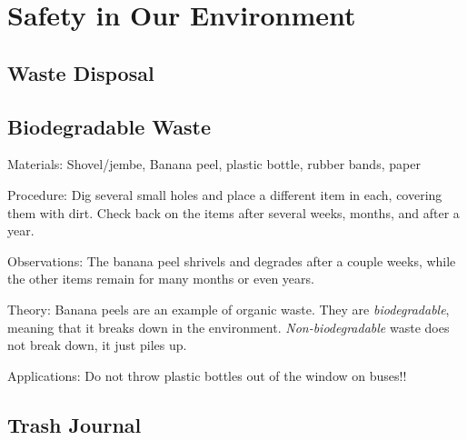 \section{Safety in Our Environment}

\begin{multicols}{2}


\section*{Waste Disposal}


\subsection{Biodegradable Waste} %


\begin{description*}
\item[Materials:]{Shovel/jembe, Banana peel, plastic bottle, rubber bands, paper}
\item[Procedure:]{Dig several small holes and place a different item in each, covering them with dirt. Check back on the items after several weeks, months, and after a year.}
\item[Observations:]{The banana peel shrivels and degrades after a couple weeks, while the other items remain for many months or even years.}
\item[Theory:]{Banana peels are an example of organic waste. They are \emph{biodegradable}}, meaning that it breaks down in the environment. \emph{Non-biodegradable} waste does not break down, it just piles up.
\item[Applications:]{Do not throw plastic bottles out of the window on buses!!}
\end{description*}

\vfill
\columnbreak

\subsection{Trash Journal} %


\end{multicols}
